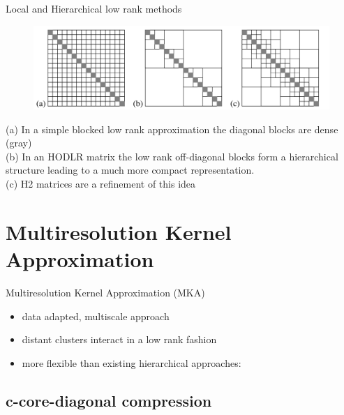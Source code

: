 \documentclass{beamer}
\begin{document}


\begin{frame}{Local and Hierarchical low rank methods}
    
    \begin{figure}
        \centering
        \includegraphics[scale=0.15]{figs/matrixsketch.png}
        \label{fig:my_label}
    \end{figure}
    (a) In a simple blocked low rank approximation the diagonal blocks
    are dense (gray)\\
    (b) In an HODLR matrix the low rank off-diagonal blocks form a hierarchical structure leading to a much more compact representation.\\
    (c) H2 matrices are a refinement of this idea
    
\end{frame}

\section{Multiresolution Kernel Approximation}

\begin{frame}{Multiresolution Kernel Approximation (MKA)}
    \begin{itemize}
        \item data adapted, multiscale approach
        \item distant clusters interact in a low rank fashion
        \item more flexible than existing hierarchical approaches: 
    \end{itemize}
\end{frame}

\subsection{c-core-diagonal compression}
\end{document}

